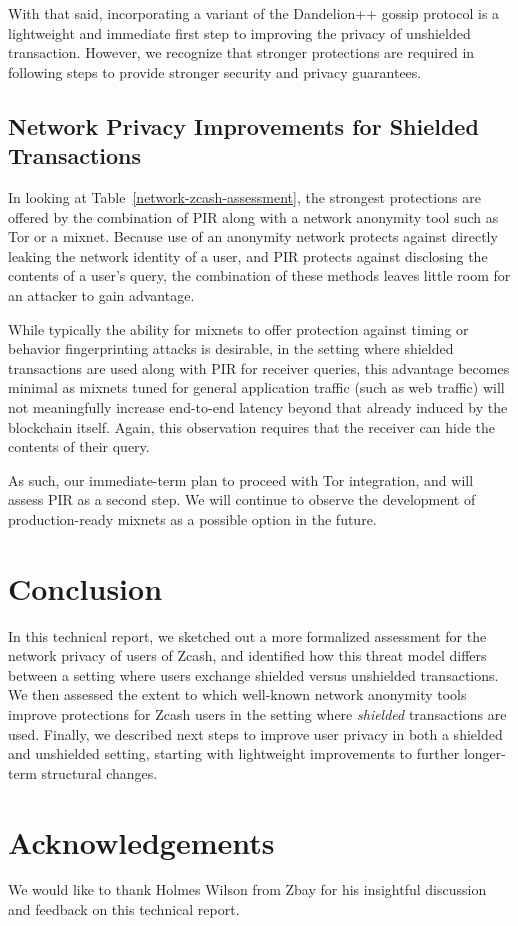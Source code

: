 \documentclass{article}
\begin{document}
With that said, incorporating a variant of the Dandelion++ gossip protocol is a
lightweight and immediate first step to improving the privacy of unshielded
transaction. However, we recognize that stronger protections are required in
following steps to provide stronger security and privacy guarantees.

\subsection{Network Privacy Improvements for Shielded Transactions}

In looking at Table~\ref{network-zcash-assessment}, the strongest protections
are offered by the combination of PIR along with a network anonymity tool such
as Tor or a mixnet. Because use of an anonymity network protects against
directly leaking the network identity of a user, and PIR protects against
disclosing the contents of a user's query, the combination of these methods
leaves little room for an attacker to gain advantage.

While typically the
ability for mixnets to offer protection
against timing or behavior fingerprinting attacks is desirable,
in the setting where shielded transactions are used along
with PIR for receiver queries, this advantage becomes minimal as mixnets tuned
for general application traffic (such as web traffic) will not meaningfully
increase  end-to-end latency beyond that already induced by the blockchain
itself.
Again, this observation requires that the receiver can hide the contents of
their query.

As such, our immediate-term plan to proceed with Tor integration, and will
assess PIR as a second step.
We will continue to observe the development of production-ready mixnets as a
possible option in the future.

\section{Conclusion}
\label{conclusion}

In this technical report, we sketched out a more formalized assessment for the
network privacy of
users of Zcash, and identified how this threat model differs between a setting
where users exchange shielded versus unshielded transactions. We then assessed
the extent to which well-known network anonymity tools improve protections for
Zcash users in the setting where \emph{shielded} transactions are used.
Finally, we described next steps to improve user privacy in both a shielded and
unshielded setting, starting with lightweight improvements to further
longer-term structural changes.

\section{Acknowledgements}

We would like to thank Holmes Wilson from Zbay for his insightful discussion
and feedback on this technical report.



\end{document}
